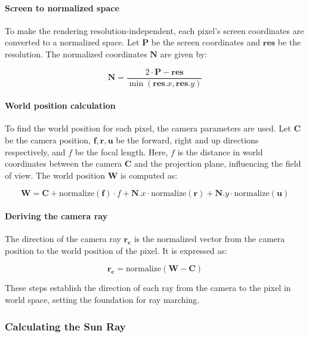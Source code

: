 \paragraph{Screen to normalized space}
To make the rendering resolution-independent, each pixel's screen coordinates are converted to a normalized space. Let $\mathbf{P}$ be the screen coordinates and $\mathbf{res}$ be the resolution. The normalized coordinates $\mathbf{N}$ are given by:

\begin{equation}
   \mathbf{N} = \frac{2 \cdot \mathbf{P} - \mathbf{res}}{\min(\mathbf{res}.x, \mathbf{res}.y)}
\end{equation}

\paragraph{World position calculation}
To find the world position for each pixel, the camera parameters are used. Let $\mathbf{C}$ be the camera position, $\mathbf{f}, \mathbf{r}, \mathbf{u}$ be the forward, right and up directions respectively, and $f$ be the focal length. Here, $f$ is the distance in world coordinates between the camera $\mathbf{C}$ and the projection plane, influencing the field of view. The world position $\mathbf{W}$ is computed as:

\begin{equation}
   \mathbf{W} = \mathbf{C} + \text{normalize}(\mathbf{f}) \cdot f + \mathbf{N}.x \cdot \text{normalize}(\mathbf{r}) + \mathbf{N}.y \cdot \text{normalize}(\mathbf{u})
\end{equation}

\paragraph{Deriving the camera ray}
The direction of the camera ray $\mathbf{r_c}$ is the normalized vector from the camera position to the world position of the pixel. It is expressed as:

\begin{equation}
   \mathbf{r_c} = \text{normalize}(\mathbf{W} - \mathbf{C})
\end{equation}

These steps establish the direction of each ray from the camera to the pixel in world space, setting the foundation for ray marching.

\subsubsection{Calculating the Sun Ray}
\label{Sun Ray}

